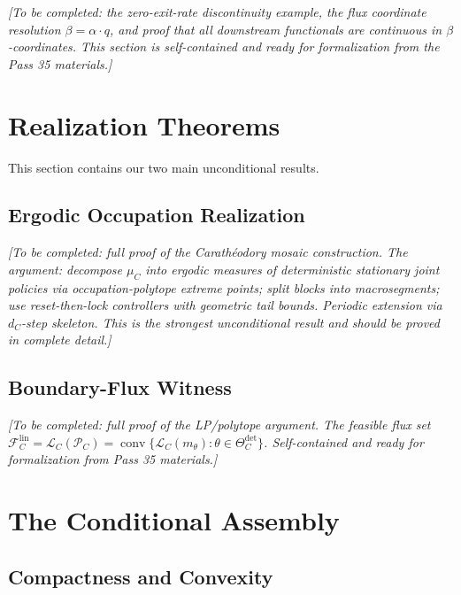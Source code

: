 \documentclass[12pt,a4paper]{article}
\theoremstyle{definition}
\DeclareMathOperator{\conv}{conv}
\begin{document}
\textit{[To be completed: the zero-exit-rate discontinuity example, the flux coordinate resolution $\beta = \alpha \cdot q$, and proof that all downstream functionals are continuous in $\beta$-coordinates.  This section is self-contained and ready for formalization from the Pass 35 materials.]}

\section{Realization Theorems}
\label{sec:realization}

This section contains our two main unconditional results.

\subsection{Ergodic Occupation Realization}

\textit{[To be completed: full proof of the Carath\'eodory mosaic construction.  The argument: decompose $\mu_C$ into ergodic measures of deterministic stationary joint policies via occupation-polytope extreme points; split blocks into macrosegments; use reset-then-lock controllers with geometric tail bounds.  Periodic extension via $d_C$-step skeleton.  This is the strongest unconditional result and should be proved in complete detail.]}

\subsection{Boundary-Flux Witness}

\textit{[To be completed: full proof of the LP/polytope argument.  The feasible flux set $\mathcal{F}_C^{\mathrm{lin}} = \mathcal{L}_C(\mathcal{P}_C) = \conv\{\mathcal{L}_C(m_\theta) : \theta \in \Theta_C^{\det}\}$.  Self-contained and ready for formalization from Pass 35 materials.]}

\section{The Conditional Assembly}
\label{sec:assembly}

\subsection{Compactness and Convexity}
\end{document}

